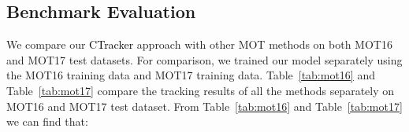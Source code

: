 \documentclass[../arXiv_main.tex]{subfiles}
\newcommand{\yang}[1]{\textcolor{black}{#1}}
\begin{document}
\subsection{Benchmark Evaluation}
We compare our \yang{CTracker} approach with other MOT methods on both MOT16 and MOT17 test datasets. For comparison, we trained our model separately using the MOT16 training data and MOT17 training data. Table~\ref{tab:mot16} and Table~\ref{tab:mot17} compare the tracking results of all the methods separately on MOT16 and MOT17 test dataset. From Table~\ref{tab:mot16} and Table~\ref{tab:mot17} we can find that:

\begin{table}[t!]
\renewcommand\arraystretch{1.2}
\centering
\caption{\textbf{Comparisons of tracking results on MOT16 test dataset}.}\label{tab:mot16}
\scriptsize{
}
\end{table}
\end{document}
